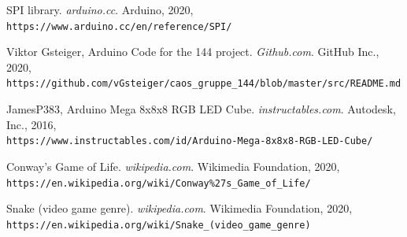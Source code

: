 \documentclass[12pt,a4paper]{article}
\begin{document}
\begin{thebibliography}{9}
	SPI library.
	\textit{arduino.cc}.
	Arduino, 2020,
	\\\texttt{https://www.arduino.cc/en/reference/SPI/}
	
	Viktor Gsteiger, Arduino Code for the 144 project.
	\textit{Github.com}.
	GitHub Inc., 2020,
	\\\texttt{https://github.com/vGsteiger/caos\_gruppe\_144/blob/master/src/README.md}
	
	JamesP383, Arduino Mega 8x8x8 RGB LED Cube. 
	\textit{instructables.com}. 
	Autodesk, Inc., 2016,
	\\\texttt{https://www.instructables.com/id/Arduino-Mega-8x8x8-RGB-LED-Cube/}
	
	Conway's Game of Life. 
	\textit{wikipedia.com}. 
	Wikimedia Foundation, 2020,
	\\\texttt{https://en.wikipedia.org/wiki/Conway\%27s\_Game\_of\_Life/}
	
	Snake (video game genre). 
	\textit{wikipedia.com}. 
	Wikimedia Foundation, 2020,
	\\\texttt{https://en.wikipedia.org/wiki/Snake\_(video\_game\_genre)}
	
	
\end{thebibliography}
\end{document}

